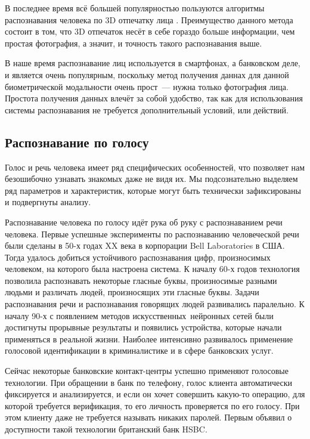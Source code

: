 \documentclass[14pt, a4paper]{extarticle}
\begin{document}
В последнее время всё большей популярностью пользуются алгоритмы распознавания человека по 3D отпечатку лица \cite{paysan20093d}. Преимущество данного метода состоит в том, что 3D отпечаток несёт в себе гораздо больше информации, чем простая фотография, а значит, и точность такого распознавания выше.

В наше время распознавание лиц используется в смартфонах, а банковском деле, и является очень популярным, поскольку метод получения даннах для данной биометрической модальности очень прост~--- нужна только фотография лица. Простота получения данных влечёт за собой удобство, так как для использования системы распознавания не требуется дополнительный условий, или действий.

\subsection{Распознавание по голосу}
Голос и речь человека имеет ряд специфических особенностей, что позволяет нам безошибочно узнавать знакомых даже не видя их. Мы подсознательно выделяем ряд параметров и характеристик, которые могут быть технически зафиксированы и подвергнуты анализу.

Распознавание человека по голосу идёт рука об руку с распознаванием речи человека. Первые успешные эксперименты по распознаванию человеческой речи были сделаны в 50-х годах XX века в корпорации Bell Laboratories в США. Тогда удалось добиться устойчивого распознавания цифр, произносимых человеком, на которого была настроена система. К началу 60-х годов технология позволила распознавать некоторые гласные буквы, произносимые разными людьми и различать людей, произносящих эти гласные буквы. Задачи распознавания речи и распознавания говорящих людей развивались паралельно. К началу 90-х с появлением методов искусственных нейронных сетей были достигнуты прорывные результаты и появились устройства, которые начали применяться в реальной жизни. Наиболее интенсивно развивалось применение голосовой идентификации в криминалистике и в сфере банковских услуг. 

Сейчас некоторые банковские контакт-центры успешно применяют голосовые технологии. При обращении в банк по телефону, голос клиента автоматически фиксируется и анализируется, и если он хочет совершить какую-то операцию, для которой требуется верификация, то его личность проверяется по его голосу. При этом клиенту даже не требуется называть никаких паролей. Первым объявил о доступности такой технологии британский банк HSBC. 
\end{document}
